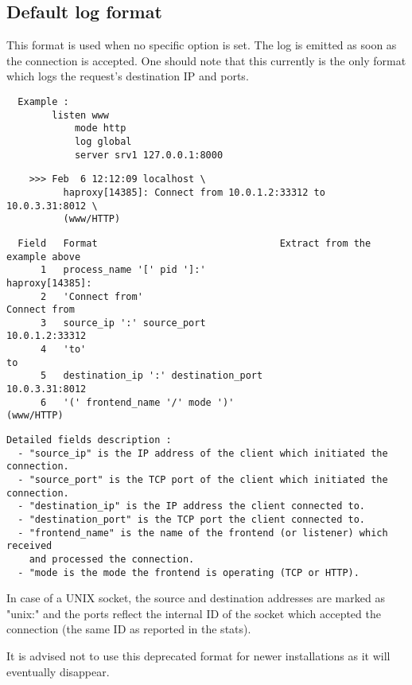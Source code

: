 
\subsection{Default log format}

This format is used when no specific option is set. The log is emitted as soon
as the connection is accepted. One should note that this currently is the only
format which logs the request's destination IP and ports.

\begin{verbatim}
  Example :
        listen www
            mode http
            log global
            server srv1 127.0.0.1:8000
\end{verbatim}

\begin{verbatim}
    >>> Feb  6 12:12:09 localhost \
          haproxy[14385]: Connect from 10.0.1.2:33312 to 10.0.3.31:8012 \
          (www/HTTP)
\end{verbatim}

\begin{verbatim}
  Field   Format                                Extract from the example above
      1   process_name '[' pid ']:'                            haproxy[14385]:
      2   'Connect from'                                          Connect from
      3   source_ip ':' source_port                             10.0.1.2:33312
      4   'to'                                                              to
      5   destination_ip ':' destination_port                   10.0.3.31:8012
      6   '(' frontend_name '/' mode ')'                            (www/HTTP)
\end{verbatim}

\begin{verbatim}
Detailed fields description :
  - "source_ip" is the IP address of the client which initiated the connection.
  - "source_port" is the TCP port of the client which initiated the connection.
  - "destination_ip" is the IP address the client connected to.
  - "destination_port" is the TCP port the client connected to.
  - "frontend_name" is the name of the frontend (or listener) which received
    and processed the connection.
  - "mode is the mode the frontend is operating (TCP or HTTP).
\end{verbatim}


In case of a UNIX socket, the source and destination addresses are marked as
"unix:" and the ports reflect the internal ID of the socket which accepted the
connection (the same ID as reported in the stats).


It is advised not to use this deprecated format for newer installations as it
will eventually disappear.


